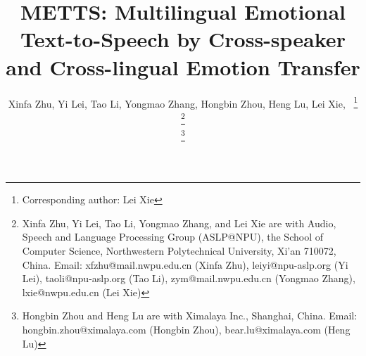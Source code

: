 \documentclass[journal,comsoc]{IEEEtran}
\begin{document}
%
\title{METTS: Multilingual Emotional Text-to-Speech by Cross-speaker and Cross-lingual Emotion Transfer}
%
\author{Xinfa Zhu,
        Yi Lei,
        Tao Li,
        Yongmao Zhang,
        Hongbin Zhou,
        Heng Lu,
        Lei Xie,~
 \thanks{Corresponding author: Lei Xie}

\thanks{Xinfa Zhu, Yi Lei, Tao Li, Yongmao Zhang, and Lei Xie are with Audio, Speech and Language Processing Group (ASLP@NPU), the School of Computer Science, Northwestern Polytechnical University, Xi’an 710072, China. Email: xfzhu@mail.nwpu.edu.cn (Xinfa Zhu), leiyi@npu-aslp.org (Yi Lei), taoli@npu-aslp.org (Tao Li), zym@mail.nwpu.edu.cn (Yongmao Zhang), lxie@nwpu.edu.cn (Lei Xie)}

\thanks{Hongbin Zhou and Heng Lu are with Ximalaya Inc., Shanghai, China. Email: hongbin.zhou@ximalaya.com (Hongbin Zhou), bear.lu@ximalaya.com (Heng Lu)}
    }


% 
\end{document}
